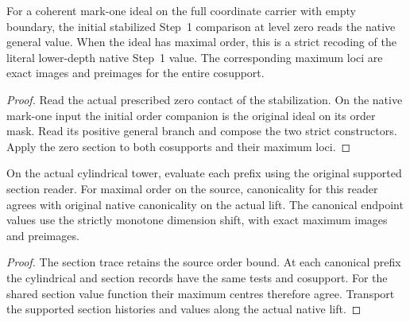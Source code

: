 \begin{theorem}
\label{hir:g1-initial-zero-literal-maxima}
\leanok
For a coherent mark-one ideal on the full coordinate
carrier with empty boundary, the initial stabilized
Step~1 comparison at level zero reads the native general
value. When the ideal has maximal order, this is a
strict recoding of the literal lower-depth native
Step~1 value. The corresponding maximum loci are
exact images and preimages for the entire cosupport.
\end{theorem}
\begin{proof}
Read the actual prescribed zero contact of the
stabilization. On the native mark-one input the initial
order companion is the original ideal on its order mask.
Read its positive general branch and compose the two
strict constructors. Apply the zero section to both
cosupports and their maximum loci.
\end{proof}

\begin{theorem}
\label{hir:g1-native-section-reader-canonical}
\leanok
On the actual cylindrical tower, evaluate each prefix
using the original supported section reader. For maximal
order on the source, canonicality for this reader agrees
with original native canonicality on the actual lift.
The canonical endpoint values use the strictly monotone
dimension shift, with exact maximum images and preimages.
\end{theorem}
\begin{proof}
The section trace retains the source order bound.
At each canonical prefix the cylindrical and section
records have the same tests and cosupport. For the shared
section value function their maximum centres therefore
agree. Transport the supported section histories and
values along the actual native lift.
\end{proof}

